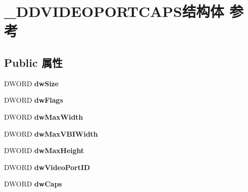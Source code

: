 \hypertarget{struct___d_d_v_i_d_e_o_p_o_r_t_c_a_p_s}{}\section{\+\_\+\+D\+D\+V\+I\+D\+E\+O\+P\+O\+R\+T\+C\+A\+P\+S结构体 参考}
\label{struct___d_d_v_i_d_e_o_p_o_r_t_c_a_p_s}
\subsection*{Public 属性}
\begin{DoxyCompactItemize}
\item 
\mbox{\label{struct___d_d_v_i_d_e_o_p_o_r_t_c_a_p_s_a69027f74c6186f6b8f60b69016a76b04}} 
D\+W\+O\+RD {\bfseries dw\+Size}
\item 
\mbox{\label{struct___d_d_v_i_d_e_o_p_o_r_t_c_a_p_s_ae46c6c7659cb6600c5822c19d1a9d457}} 
D\+W\+O\+RD {\bfseries dw\+Flags}
\item 
\mbox{\label{struct___d_d_v_i_d_e_o_p_o_r_t_c_a_p_s_ae8d194ae419b53c66f5e19786d956284}} 
D\+W\+O\+RD {\bfseries dw\+Max\+Width}
\item 
\mbox{\label{struct___d_d_v_i_d_e_o_p_o_r_t_c_a_p_s_a341e676428ca00355c35536322c2ac86}} 
D\+W\+O\+RD {\bfseries dw\+Max\+V\+B\+I\+Width}
\item 
\mbox{\label{struct___d_d_v_i_d_e_o_p_o_r_t_c_a_p_s_aa6f9f5f43d84fac995f8d39ffb5f04e0}} 
D\+W\+O\+RD {\bfseries dw\+Max\+Height}
\item 
\mbox{\label{struct___d_d_v_i_d_e_o_p_o_r_t_c_a_p_s_a927f0ca10dfc7a4fc411bb10246d94ea}} 
D\+W\+O\+RD {\bfseries dw\+Video\+Port\+ID}
\item 
\mbox{\label{struct___d_d_v_i_d_e_o_p_o_r_t_c_a_p_s_ad2ae58f56f3aa96c73c3d60e3a208cf0}} 
D\+W\+O\+RD {\bfseries dw\+Caps}
\item 
\mbox{\label{struct___d_d_v_i_d_e_o_p_o_r_t_c_a_p_s_a7b38c7c5b03467debc71fbf2db3039c4}} 

\end{DoxyCompactItemize}
